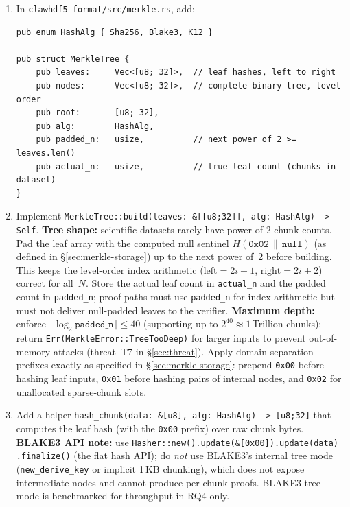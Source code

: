 \documentclass[11pt]{article}
\begin{document}
\begin{enumerate}[nosep]
  \item In \texttt{clawhdf5-format/src/merkle.rs}, add:
\begin{lstlisting}
pub enum HashAlg { Sha256, Blake3, K12 }

pub struct MerkleTree {
    pub leaves:     Vec<[u8; 32]>,  // leaf hashes, left to right
    pub nodes:      Vec<[u8; 32]>,  // complete binary tree, level-order
    pub root:       [u8; 32],
    pub alg:        HashAlg,
    pub padded_n:   usize,          // next power of 2 >= leaves.len()
    pub actual_n:   usize,          // true leaf count (chunks in dataset)
}
\end{lstlisting}
  \item Implement \texttt{MerkleTree::build(leaves: \&[[u8;32]], alg: HashAlg)
    -> Self}. \textbf{Tree shape:} scientific datasets rarely have
    power-of-2 chunk counts. Pad the leaf array with the computed null
    sentinel $H(\texttt{0x02}\,\|\,\texttt{null})$ (as defined in
    \S\ref{sec:merkle-storage}) up to the next power
    of~2 before building. This keeps the level-order index arithmetic
    ($\text{left} = 2i+1$, $\text{right} = 2i+2$) correct for all~$N$.
    Store the actual leaf count in \texttt{actual\_n} and the padded count
    in \texttt{padded\_n}; proof paths must use \texttt{padded\_n} for
    index arithmetic but must not deliver null-padded leaves to the verifier.
    \textbf{Maximum depth:} enforce $\lceil\log_2 \mathtt{padded\_n}\rceil
    \leq 40$ (supporting up to $2^{40} \approx 1$\,Trillion chunks);
    return \texttt{Err(MerkleError::TreeTooDeep)} for larger inputs to
    prevent out-of-memory attacks (threat~T7 in \S\ref{sec:threat}).
    Apply domain-separation prefixes exactly as specified in
    \S\ref{sec:merkle-storage}: prepend \texttt{0x00} before hashing leaf
    inputs, \texttt{0x01} before hashing pairs of internal nodes, and
    \texttt{0x02} for unallocated sparse-chunk slots.
  \item Add a helper \texttt{hash\_chunk(data: \&[u8], alg: HashAlg)
    -> [u8;32]} that computes the leaf hash (with the \texttt{0x00} prefix)
    over raw chunk bytes. \textbf{BLAKE3 API note:} use
    \texttt{Hasher::new().update(\&[0x00]).update(data)\\
    .finalize()} (the flat hash API); do \emph{not} use BLAKE3's internal
    tree mode (\texttt{new\_derive\_key} or implicit 1\,KB chunking), which
    does not expose intermediate nodes and cannot produce per-chunk proofs.
    BLAKE3 tree mode is benchmarked for throughput in RQ4 only.

\end{enumerate}
\end{document}
